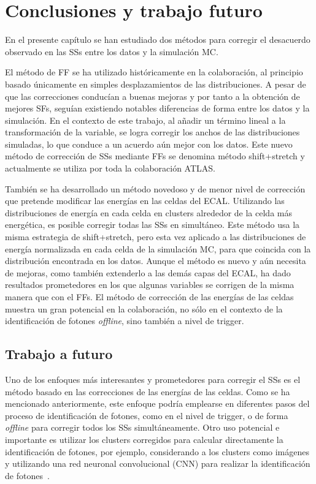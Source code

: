 \section{Conclusiones y trabajo futuro}
\label{sec:ss_corrections:summary}

En el presente capítulo se han estudiado dos métodos para corregir el desacuerdo observado en las \acfp{SS} entre los datos y la simulación \ac{MC}.

El método de \acf{FF} se ha utilizado históricamente en la colaboración, al principio basado únicamente en simples desplazamientos de las distribuciones. A pesar de que las correcciones conducían a buenas mejoras y por tanto a la obtención de mejores \acp{SF}, seguían existiendo notables diferencias de forma entre los datos y la simulación. En el contexto de este trabajo, al añadir un término lineal a la transformación de la variable, se logra corregir los anchos de las distribuciones simuladas, lo que conduce a un acuerdo aún mejor con los datos. Este nuevo método de corrección de \acp{SS} mediante \acp{FF} se denomina método shift+stretch y actualmente se utiliza por toda la colaboración \ac{ATLAS}.

También se ha desarrollado un método novedoso y de menor nivel de correcci\'on que pretende modificar las energías en las celdas del \ac{ECAL}. Utilizando las distribuciones de energía en cada celda en clusters alrededor de la celda más energética, es posible corregir todas las \acp{SS} en simult\'aneo. Este método usa la misma estrategia de shift+stretch, pero esta vez aplicado a las distribuciones de energ\'ia normalizada en cada celda de la simulación \ac{MC}, para que coincida con la distribución encontrada en los datos. Aunque el método es nuevo y aún necesita de mejoras, como tambi\'en extenderlo a las dem\'as capas del \ac{ECAL}, ha dado resultados prometedores en los que algunas variables se corrigen de la misma manera que con el \acp{FF}. El método de correcci\'on de las energ\'ias de las celdas muestra un gran potencial en la colaboración, no sólo en el contexto de la identificación de fotones \textit{offline}, sino también a nivel de trigger.

\subsection{Trabajo a futuro}

Uno de los enfoques más interesantes y prometedores para corregir el \acp{SS} es el método basado en las correcciones de las energ\'ias de las celdas. Como se ha mencionado anteriormente, este enfoque podría emplearse en diferentes pasos del proceso de identificación de fotones, como en el nivel de trigger, o de forma \textit{offline} para corregir todos los \acp{SS} simultáneamente. Otro uso potencial e importante es utilizar los clusters corregidos para calcular directamente la identificación de fotones, por ejemplo, considerando a los clusters como imágenes y utilizando una red neuronal convolucional (CNN) para realizar la identificación de fotones~\cite{thesis_belfkir}.

